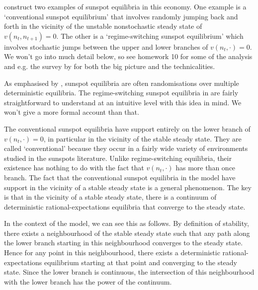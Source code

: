 \documentclass[11pt,letterpaper,reqno,oneside]{article}
\begin{document}
\textcite{ChristianoHarrison1999} construct two examples of sunspot equilibria in this economy. One example is a `conventional sunspot equilibrium' that involves randomly jumping back and forth in the vicinity of the unstable nonstochastic steady state of $v(n_t,n_{t+1})=0$. The other is a `regime-switching sunspot equilibrium' which involves stochastic jumps between the upper and lower branches of $v(n_t,\cdot)=0$. We won't go into much detail below, so see homework 10 for some of the analysis and e.g. the survey by \textcite{BenhabibFarmer1999} for both the big picture and the technicalities.

As emphasised by \textcite{BenhabibFarmer1999}, sunspot equilibria are often randomisations over multiple deterministic equilibria. The regime-switching sunspot equilibria in \textcite{ChristianoHarrison1999} are fairly straightforward to understand at an intuitive level with this idea in mind. We won't give a more formal account than that.

The conventional sunspot equilibria have support entirely on the lower branch of $v(n_t,\cdot)=0$, in particular in the vicinity of the stable steady state. They are called `conventional' because they occur in a fairly wide variety of environments studied in the sunspots literature. Unlike regime-switching equilibria, their existence has nothing to do with the fact that $v(n_t,\cdot)$ has more than once branch. The fact that the conventional sunspot equilibria in the \textcite{ChristianoHarrison1999} model have support in the vicinity of a stable steady state is a general phenomenon. The key is that in the vicinity of a stable steady state, there is a continuum of deterministic rational-expectations equilibria that converge to the steady state.

In the context of the \textcite{ChristianoHarrison1999} model, we can see this as follows. By definition of stability, there exists a neighbourhood of the stable steady state such that any path along the lower branch starting in this neighbourhood converges to the steady state. Hence for any point in this neighbourhood, there exists a deterministic rational-expectations equilibrium starting at that point and converging to the steady state. Since the lower branch is continuous, the intersection of this neighbourhood with the lower branch has the power of the continuum.
\end{document}
